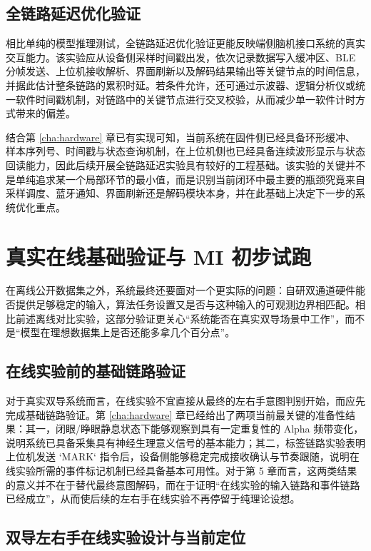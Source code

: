 \subsection{全链路延迟优化验证}

相比单纯的模型推理测试，全链路延迟优化验证更能反映端侧脑机接口系统的真实交互能力。该实验应从设备侧采样时间戳出发，依次记录数据写入缓冲区、BLE 分帧发送、上位机接收解析、界面刷新以及解码结果输出等关键节点的时间信息，并据此估计整条链路的累积时延。若条件允许，还可通过示波器、逻辑分析仪或统一软件时间戳机制，对链路中的关键节点进行交叉校验，从而减少单一软件计时方式带来的偏差。

结合第 \ref{cha:hardware} 章已有实现可知，当前系统在固件侧已经具备环形缓冲、样本序列号、时间戳与状态查询机制，在上位机侧也已经具备连续波形显示与状态回读能力，因此后续开展全链路延迟实验具有较好的工程基础。该实验的关键并不是单纯追求某一个局部环节的最小值，而是识别当前闭环中最主要的瓶颈究竟来自采样调度、蓝牙通知、界面刷新还是解码模块本身，并在此基础上决定下一步的系统优化重点。

\section{真实在线基础验证与 MI 初步试跑}

在离线公开数据集之外，系统最终还要面对一个更实际的问题：自研双通道硬件能否提供足够稳定的输入，算法任务设置又是否与这种输入的可观测边界相匹配。相比前述离线对比实验，这部分验证更关心“系统能否在真实双导场景中工作”，而不是“模型在理想数据集上是否还能多拿几个百分点”。

\subsection{在线实验前的基础链路验证}

对于真实双导系统而言，在线实验不宜直接从最终的左右手意图判别开始，而应先完成基础链路验证。第 \ref{cha:hardware} 章已经给出了两项当前最关键的准备性结果：其一，闭眼/睁眼静息状态下能够观察到具有一定重复性的 Alpha 频带变化，说明系统已具备采集具有神经生理意义信号的基本能力；其二，标签链路实验表明上位机发送 `MARK` 指令后，设备侧能够稳定完成接收确认与节奏跟随，说明在线实验所需的事件标记机制已经具备基本可用性。对于第 5 章而言，这两类结果的意义并不在于替代最终意图解码，而在于证明“在线实验的输入链路和事件链路已经成立”，从而使后续的左右手在线实验不再停留于纯理论设想。

\subsection{双导左右手在线实验设计与当前定位}

